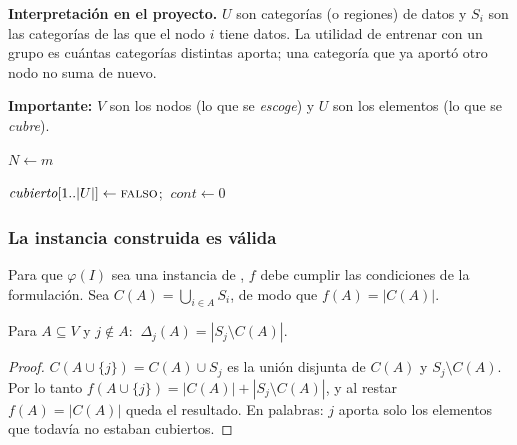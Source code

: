 \textbf{Interpretación en el proyecto.} $U$ son categorías (o regiones) de datos y $S_i$ son las categorías de las que el nodo $i$ tiene datos. La utilidad de entrenar con un grupo es cuántas categorías distintas aporta; una categoría que ya aportó otro nodo no suma de nuevo.

\textbf{Importante:} $V$ son los nodos (lo que se \emph{escoge}) y $U$ son los elementos (lo que se \emph{cubre}).

\begin{algorithm}[H]
\caption{\textsc{Transformar}$(U,\ S_1,\dots,S_m,\ k,\ t)$}\label{alg:tau}
$N\leftarrow m$\;
 
\end{algorithm}

\begin{algorithm}[H]
\caption{\textsc{Evaluar-}$f(A)$}\label{alg:evalf}
$\textit{cubierto}[1..|U|]\leftarrow \textsc{falso}$; $\ \textit{cont}\leftarrow 0$\;
\;
\end{algorithm}

\subsubsection{La instancia construida es válida}

Para que $\varphi(I)$ sea una instancia de \SEL, $f$ debe cumplir las condiciones de la formulación. Sea $C(A)=\bigcup_{i\in A}S_i$, de modo que $f(A)=|C(A)|$.

\begin{lema}\label{lem:ganancia}
Para $A\subseteq V$ y $j\notin A$: $\ \Delta_j(A) = |S_j\setminus C(A)|$.
\end{lema}
\begin{proof}
$C(A\cup\{j\}) = C(A)\cup S_j$ es la unión disjunta de $C(A)$ y $S_j\setminus C(A)$. Por lo tanto $f(A\cup\{j\}) = |C(A)| + |S_j\setminus C(A)|$, y al restar $f(A)=|C(A)|$ queda el resultado. En palabras: $j$ aporta solo los elementos que todavía no estaban cubiertos.
\end{proof}

